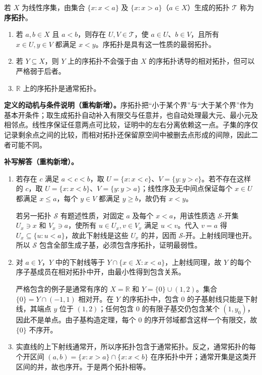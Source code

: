 \documentclass[../../main.tex]{subfiles}%
\begin{document}
\begin{exercise}\label{exercise:ch04-order-topology}
\begin{definition*}[序拓扑]\label{definition:ch04-order-topology}
若 $X$ 为线性序集，由集合 $\{x:x<a\}$ 及 $\{x:x>a\}$（$a\in X$）生成的拓扑 $\mathcal T$ 称为\textbf{序拓扑}。
\end{definition*}
\begin{enumerate}
\item\label{item:ch04-order-separation} 若 $a,b\in X$ 且 $a<b$，则存在 $U,V\in\mathcal T$，使 $a\in U$、$b\in V$，且所有 $x\in U,y\in V$ 都满足 $x<y$。序拓扑是具有这一性质的最弱拓扑。
\item\label{item:ch04-order-relative} 若 $Y\subseteq X$，则 $Y$ 上的序拓扑不会强于由 $X$ 的序拓扑诱导的相对拓扑，但可以严格弱于后者。
\item\label{item:ch04-order-real} $\mathbb R$ 上的序拓扑是通常拓扑。
\end{enumerate}
\end{exercise}
\begin{remark}
\textbf{定义的动机与条件说明（重构新增）。}序拓扑把“小于某个界”与“大于某个界”作为基本开条件；取生成拓扑自动补入有限交与任意并，也自动处理最大元、最小元及相邻点。线性序保证任意两点可比较，证明中的左右分离依赖这一点。子集的序仅记录剩余点之间的比较，而相对拓扑还保留原空间中被删去点形成的间隙，因此二者可能不同。
\end{remark}
\begin{solution}
\textbf{补写解答（重构新增）。}
\begin{enumerate}
\item 若存在 $c$ 满足 $a<c<b$，取 $U=\{x:x<c\}$、$V=\{y:y>c\}$。若不存在这样的 $c$，取 $U=\{x:x<b\}$、$V=\{y:y>a\}$；线性序及无中间点保证每个 $x\in U$ 都满足 $x\le a$，每个 $y\in V$ 都满足 $y\ge b$，故仍有 $x<y$。

若另一拓扑 $\mathcal S$ 有题述性质，对固定 $a$ 及每个 $x<a$，用该性质选 $\mathcal S$-开集 $U_x\ni x$ 和 $V_x\ni a$，使所有 $u\in U_x,v\in V_x$ 满足 $u<v$。代入 $v=a$ 得 $U_x\subseteq\{u:u<a\}$，故此下射线是这些 $U_x$ 的并，因而 $\mathcal S$-开。上射线同理也开。所以 $\mathcal S$ 包含全部生成子基，必须包含序拓扑，证明最弱性。
\item 对 $a\in Y$，$Y$ 中的下射线等于 $Y\cap\{x\in X:x<a\}$，上射线同理，故 $Y$ 的每个序子基成员在相对拓扑中开，由最小性得到包含关系。

严格包含的例子是通常有序的 $X=\mathbb R$ 和 $Y=\{0\}\cup(1,2)$。集合 $\{0\}=Y\cap(-1,1)$ 相对开。在 $Y$ 的序拓扑中，包含 $0$ 的子基射线只能是下射线，其端点 $y$ 位于 $(1,2)$；任何包含 $0$ 的有限子基交仍包含某个 $(1,y_0)$，因此不是单点。由子基构造定理，每个 $0$ 的序开邻域都含这样一个有限交，故 $\{0\}$ 不序开。
\item 实直线的上下射线通常开，所以序拓扑包含于通常拓扑。反之，通常拓扑的每个开区间 $(a,b)=\{x:x>a\}\cap\{x:x<b\}$ 在序拓扑中开；通常开集是这类开区间的并，故也序开。于是两个拓扑相等。
\end{enumerate}
\end{solution}
\end{document}
